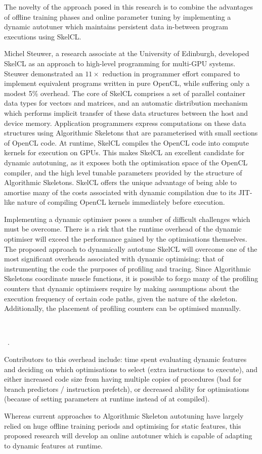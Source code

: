The novelty of the approach posed in this research is to combine the
advantages of offline training phases and online parameter tuning by
implementing a dynamic autotuner which maintains persistent data
in-between program executions using SkelCL.

Michel Steuwer, a research associate at the University of Edinburgh,
developed SkelCL as an approach to high-level programming for
multi-GPU systems. Steuwer demonstrated an $11\times$ reduction in
programmer effort compared to implement equivalent programs written in
pure OpenCL, while suffering only a modest 5\% overhead. The core of
SkelCL comprises a set of parallel container data types for vectors
and matrices, and an automatic distribution mechanism which performs
implicit transfer of these data structures between the host and device
memory. Application programmers express computations on these data
structures using Algorithmic Skeletons that are parameterised with
small sections of OpenCL code. At runtime, SkelCL compiles the OpenCL
code into compute kernels for execution on GPUs. This makes SkelCL an
excellent candidate for dynamic autotuning, as it exposes both the
optimisation space of the OpenCL compiler, and the high level tunable
parameters provided by the structure of Algorithmic Skeletons. SkelCL
offers the unique advantage of being able to amortise many of the
costs associated with dynamic compilation due to its JIT-like nature
of compiling OpenCL kernels immediately before execution.

Implementing a dynamic optimiser poses a number of difficult
challenges which must be overcome.
There is a risk that the runtime overhead of the dynamic optimiser
will exceed the performance gained by the optimisations
themselves. The proposed approach to dynamically autotune SkelCL will
overcome one of the most significant overheads associated with dynamic
optimising: that of instrumenting the code the purposes of profiling
and tracing. Since Algorithmic Skeletons coordinate muscle functions,
it is possible to forgo many of the profiling counters that dynamic
optimisers require by making assumptions about the execution frequency
of certain code paths, given the nature of the skeleton. Additionally,
the placement of profiling counters can be optimised manually.

~\cite{Steuwer2011, Steuwer2013a}

~\cite{Steuwer2012}.

Contributors to this overhead include: time spent evaluating dynamic
features and deciding on which optimisations to select (extra
instructions to execute), and either increased code size from having
multiple copies of procedures (bad for branch predictors / instruction
prefetch), or decreased ability for optimisations (because of setting
parameters at runtime instead of at compiled).

Whereas current approaches to Algorithmic Skeleton autotuning have
largely relied on huge offline training periods and optimising for
static features, this proposed research will develop an online
autotuner which is capable of adapting to dynamic features at runtime.
